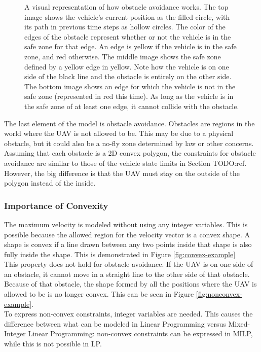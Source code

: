 \begin{figure}[!t]
\begin{subfigure}[t]{0.47\textwidth}
        \caption{}
    \end{subfigure}
    \caption{A visual representation of how obstacle avoidance works. The top image shows the vehicle's current position as the filled circle, with its path in previous time steps as hollow circles. The color of the edges of the obstacle represent whether or not the vehicle is in the safe zone for that edge. An edge is yellow if the vehicle is in the safe zone, and red otherwise. The middle image shows the safe zone defined by a yellow edge in yellow. Note how the vehicle is on one side of the black line and the obstacle is entirely on the other side. The bottom image shows an edge for which the vehicle is not in the safe zone (represented in red this time). As long as the vehicle is in the safe zone of at least one edge, it cannot collide with the obstacle.}\label{fig:obs}
\end{figure}
The last element of the model is obstacle avoidance. Obstacles are regions in the world where the UAV is not allowed to be. This may be due to a physical obstacle, but it could also be a no-fly zone determined by law or other concerns. \\
Assuming that each obstacle is a 2D convex polygon, the constraints for obstacle avoidance are similar to those of the vehicle state limits in Section TODO:ref. However, the big difference is that the UAV must stay on the outside of the polygon instead of the inside. \\
\subsubsection{Importance of Convexity}
The maximum velocity is modeled without using any integer variables. This is possible because the allowed region for the velocity vector is a convex shape. A shape is convex if a line drawn between any two points inside that shape is also fully inside the shape. This is demonstrated in Figure \ref{fig:convex-example}\\
This property does not hold for obstacle avoidance. If the UAV is on one side of an obstacle, it cannot move in a straight line to the other side of that obstacle. Because of that obstacle, the shape formed by all the positions where the UAV is allowed to be is no longer convex. This can be seen in Figure \ref{fig:nonconvex-example}. \\
To express non-convex constraints, integer variables are needed. This causes the difference between what can be modeled in Linear Programming versus Mixed-Integer Linear Programming: non-convex constraints can be expressed in MILP, while this is not possible in LP.


